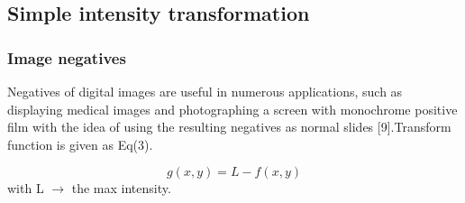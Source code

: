 \subsection{Simple intensity transformation}
\subsubsection{Image negatives}
Negatives of digital images are useful in numerous applications,
such as displaying medical images and photographing a screen with monochrome positive
film with the idea of using the resulting negatives as normal slides [9].Transform function is given as Eq(3).

        \begin{equation}
                g(x,y) = L - f(x,y)
        \end{equation}
with L $\rightarrow$ the max intensity.

